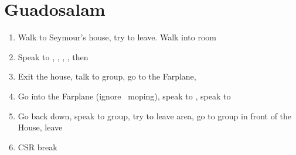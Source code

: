 \chapter{Guadosalam}

\begin{enumerate}
    \item Walk to Seymour's house, try to leave. Walk into room
    \item Speak to \wakka, \auron, \lulu, \rikku, then \yuna
    \item Exit the house, talk to group, go to the Farplane, 
    \item Go into the Farplane (ignore \auron\ moping), speak to \wakka, speak to \yuna
    \item Go back down, speak to group, try to leave area, go to group in front of the House, leave
    \wincb\losscb\bothcb
    \item CSR break
\end{enumerate}
